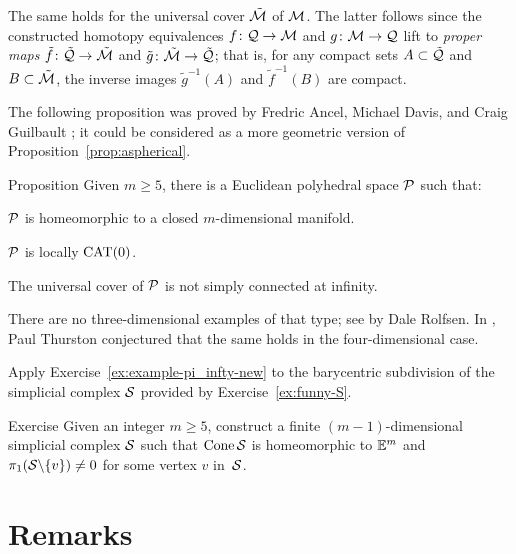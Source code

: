 The same holds for 
the universal cover $\tilde{\mathcal{M}}$ of $\mathcal{M}$.
The latter follows since the constructed homotopy equivalences 
$f\colon \mathcal{Q}\to \mathcal{M}$ and $g\:\spc M\z\to \spc Q$ 
lift to {}\emph{proper maps} 
$\tilde f \colon \tilde{\mathcal{Q}}\to \tilde{\mathcal{M}}$
and $\tilde g \colon \tilde{\mathcal{M}}\to \tilde{\mathcal{Q}}$;
that is, for any compact sets $A\subset \tilde{\mathcal{Q}}$ and $B\subset\tilde{\mathcal{M}}$, the inverse images $\tilde g^{-1}(A)$ and $\tilde f^{-1}(B)$ are compact.
\qeds


The following proposition was proved by
Fredric Ancel, 
Michael Davis,
and Craig Guilbault \cite{ancel-davis-guilbault};
it could be considered as a more geometric version of Proposition~\ref{prop:aspherical}.


\begin{thm}{Proposition}\label{prop:loc-CAT-mnfld}
Given $m\ge 5$, there is a Euclidean polyhedral space $\mathcal{P}$ such that:
\begin{subthm}{}
$\mathcal{P}$ is homeomorphic to a closed $m$-dimensional manifold.
\end{subthm}

\begin{subthm}{}
$\mathcal{P}$ is locally $\mathrm{CAT}(0)$.
\end{subthm}

\begin{subthm}{}
The universal cover of $\mathcal{P}$ is not simply connected at infinity.
\end{subthm}
\end{thm}

There are no three-dimensional examples of that type;
see \cite{rolfsen} by Dale Rolfsen.
In \cite{thurston}, Paul Thurston conjectured that the same holds in the four-dimensional case.

Apply Exercise~\ref{ex:example-pi_infty-new} to the barycentric subdivision of the simplicial complex $\mathcal{S}$ provided by Exercise~\ref{ex:funny-S}.
\qeds

\begin{thm}{Exercise}\label{ex:funny-S}
Given an integer $m\ge 5$,
construct a finite $(m-1)$-dimensional simplicial complex $\mathcal{S}$ such that $\mathop{\rm Cone}\nolimits\mathcal{S}$ is homeomorphic to $\mathbb{E}^m$
and $\pi_1(\mathcal{S}\backslash\{v\})\ne0$ for some vertex $v$ in~$\mathcal{S}$.
\end{thm} 

\section{Remarks}

